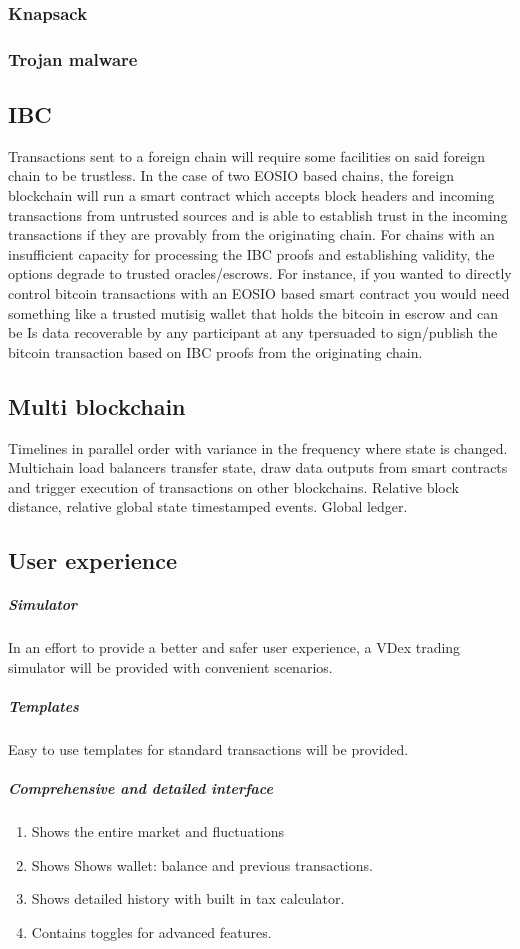 \documentclass[]{article}
\begin{document}
		\subsubsection{Knapsack}  
		\subsubsection{Trojan malware}
		
		
		
	\subsection{IBC}
	
	Transactions sent to a foreign chain will require some facilities on said foreign chain to be trustless. 
	In the case of two EOSIO based chains, the foreign blockchain will run a smart contract which accepts block headers and incoming transactions from untrusted sources and is able to establish trust in the incoming transactions if they are provably from the originating chain. 
	For chains with an insufficient capacity for processing the IBC proofs and establishing validity, the options degrade to trusted oracles/escrows.
	For instance, if you wanted to directly control bitcoin transactions with an EOSIO based smart contract you would need something like a trusted mutisig wallet that holds the bitcoin in escrow and can be 	Is data recoverable by any participant at any tpersuaded to sign/publish the bitcoin transaction based on IBC proofs from the originating chain.
	
	\subsection{Multi blockchain}
	Timelines in parallel order with variance in the frequency where state is changed.
	Multichain load balancers transfer state, draw data outputs from smart contracts and 
	trigger execution of transactions on other blockchains. 
	Relative block distance, relative global state timestamped events.
	Global ledger.
		
	\subsection{User experience}
	\subparagraph{Simulator}
	In an effort to provide a better and safer user experience, 
	a VDex trading simulator will be provided with convenient scenarios.
	\subparagraph{Templates}
	Easy to use templates for standard transactions will be provided.
	\subparagraph{Comprehensive and detailed interface}
	\begin{enumerate}
		\item Shows the entire market and fluctuations
		\item Shows Shows wallet: balance and previous transactions.
		\item Shows detailed history with built in tax calculator.
		\item Contains toggles for advanced features.		 
	\end{enumerate}
	
\end{document}
